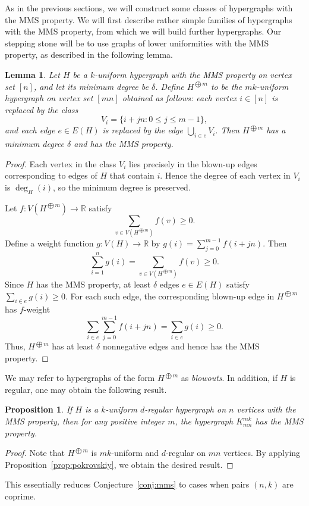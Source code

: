 \documentclass[12pt,UKenglish]{amsart}
\theoremstyle{plain}
\newtheorem{lemma}[thm]{Lemma}
\newtheorem{prop}[thm]{Proposition}
\theoremstyle{definition}
\theoremstyle{remark}
\begin{document}
As in the previous sections, we will construct some classes of hypergraphs with the MMS property.
 We will first describe rather simple families of hypergraphs with the MMS property, from which we will build further hypergraphs.
 Our stepping stone will be to use graphs of lower uniformities with the MMS property, as described in the following lemma.
 \begin{lemma}\label{lem:blowout}
  Let $H$ be a $k$-uniform hypergraph with the MMS property on vertex set $[n]$, and let its minimum degree be $\delta$.
  Define $H^{\bigoplus m}$ to be the $mk$-uniform hypergraph on vertex set $[mn]$ obtained as follows: each vertex $i\in [n]$ is replaced by the class
  \[
    V_i=\{i+jn:0\le j\le m-1\},
  \]
  and each edge $e\in E(H)$ is replaced by the edge
  \(
    \bigcup_{i\in e} V_i.
  \)
  Then $H^{\bigoplus m}$ has a minimum degree $\delta$ and has the MMS property.
\end{lemma}

\begin{proof}
Each vertex in the class $V_i$ lies precisely in the blown-up edges corresponding to edges of $H$ that contain $i$. Hence the degree of each vertex in $V_i$ is $\deg_H(i)$, so the minimum degree is preserved.

Let $f:V(H^{\bigoplus m})\to \mathbb R$ satisfy
\[
\sum_{v\in V(H^{\bigoplus m})} f(v)\ge 0.
\]
Define a weight function $g:V(H)\to\mathbb R$ by
\(
g(i)=\sum_{j=0}^{m-1} f(i+jn).
\)
Then
\[
\sum_{i=1}^n g(i)=\sum_{v\in V(H^{\bigoplus m})} f(v)\ge 0.
\]
Since $H$ has the MMS property, at least $\delta$ edges $e\in E(H)$ satisfy
\(
\sum_{i\in e} g(i)\ge 0.
\)
For each such edge, the corresponding blown-up edge in $H^{\bigoplus m}$ has $f$-weight
\[
\sum_{i\in e}\sum_{j=0}^{m-1} f(i+jn)=\sum_{i\in e}g(i)\ge0.
\]
Thus, $H^{\bigoplus m}$ has at least $\delta$ nonnegative edges and hence has the MMS property.
\end{proof}

We may refer to hypergraphs of the form $ H^{\bigoplus m}$ as \emph{blowouts}. In addition, if $H$ is regular, one may obtain the following result.
 \begin{prop}
 If $H$ is a $k$-uniform $d$-regular hypergraph on $n$ vertices with the MMS property, then for any positive integer $m$, the hypergraph $K_{mn}^{mk}$ has the MMS property.
 \end{prop}
 \begin{proof}
     Note that $H^{\bigoplus m}$ is $mk$-uniform and $d$-regular on $mn$ vertices. By applying Proposition~\ref{prop:pokrovskiy}, we obtain the desired result.
 \end{proof}
 This essentially reduces Conjecture~\ref{conj:mms} to cases when pairs $(n,k)$ are coprime.
 
\end{document}
